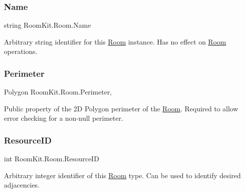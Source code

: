 \mbox{\label{class_room_kit_1_1_room_aabb40fd8aae88fa3a5c3b7ce6adee86e}} 
\subsubsection{\texorpdfstring{Name}{Name}}
{\footnotesize\ttfamily string Room\+Kit.\+Room.\+Name\hspace{0.3cm}{\ttfamily [get]}}



Arbitrary string identifier for this \mbox{\hyperlink{class_room_kit_1_1_room}{Room}} instance. Has no effect on \mbox{\hyperlink{class_room_kit_1_1_room}{Room}} operations. 

\mbox{\label{class_room_kit_1_1_room_abe9afa0fc1d95dc7469e80bdd411c26b}} 
\subsubsection{\texorpdfstring{Perimeter}{Perimeter}}
{\footnotesize\ttfamily Polygon Room\+Kit.\+Room.\+Perimeter\hspace{0.3cm}{\ttfamily [get]}, {\ttfamily [set]}}



Public property of the 2D Polygon perimeter of the \mbox{\hyperlink{class_room_kit_1_1_room}{Room}}. Required to allow error checking for a non-\/null perimeter. 

\mbox{\label{class_room_kit_1_1_room_ac33f1b7a0a0b1c42c3665068ea77cb89}} 
\subsubsection{\texorpdfstring{Resource\+ID}{ResourceID}}
{\footnotesize\ttfamily int Room\+Kit.\+Room.\+Resource\+ID\hspace{0.3cm}{\ttfamily [get]}}



Arbitrary integer identifier of this \mbox{\hyperlink{class_room_kit_1_1_room}{Room}} type. Can be used to identify desired adjacencies. 

